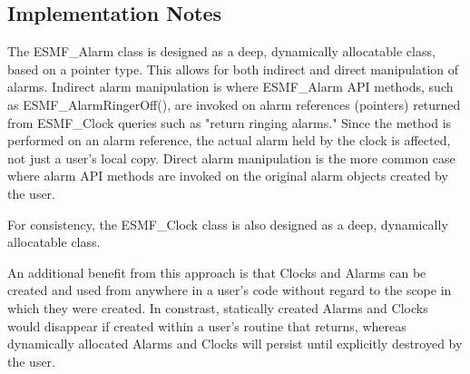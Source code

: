 
\subsection{Implementation Notes}

The ESMF\_Alarm class is designed as a deep, dynamically allocatable class,
based on a pointer type.  This allows for both indirect and direct
manipulation of alarms.  Indirect alarm manipulation is where ESMF\_Alarm API
methods, such as ESMF\_AlarmRingerOff(), are invoked on alarm references
(pointers) returned from ESMF\_Clock queries such as "return ringing alarms."
Since the method is performed on an alarm reference, the actual alarm held
by the clock is affected, not just a user's local copy.  Direct alarm
manipulation is the more common case where alarm API methods are invoked on
the original alarm objects created by the user.

For consistency, the ESMF\_Clock class is also designed as a deep, dynamically
allocatable class. 

An additional benefit from this approach is that Clocks and Alarms can be
created and used from anywhere in a user's code without regard to the scope
in which they were created.  In constrast, statically created Alarms and
Clocks would disappear if created within a user's routine that returns,
whereas dynamically allocated Alarms and Clocks will persist until explicitly
destroyed by the user.
